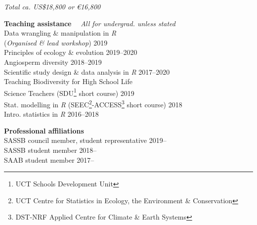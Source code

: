 \documentclass[10pt]{article}
\begin{document}
\begin{multicols}{2}
\begin{center}
  \textit{Total ca. US\$18,800 or €16,800}
\end{center}

\columnbreak

\textbf{Teaching assistance} %
  ~~{\small \textmd{\textit{All for undergrad. unless stated}}}\\

Data wrangling \& manipulation in \textit{R} \\
\hspace{2em} (\textit{Organised \& lead workshop})       \hfill {\small 2019} \\
Principles of ecology \& evolution                 \hfill {\small 2019--2020} \\
Angiosperm diversity                               \hfill {\small 2018--2019} \\
Scientific study design \& data analysis in \textit{R}
                                                   \hfill {\small 2017--2020} \\
Teaching Biodiversity for High School Life \\
\hspace{2em} Science Teachers {\small (SDU\footnote{UCT Schools Development
  Unit} short course)}                                   \hfill {\small 2019} \\
Stat. modelling in \textit{R} {\small (SEEC\footnote{UCT Centre for
  Statistics in Ecology, the Environment \& Conservation}-ACCESS\footnote{
  DST-NRF Applied Centre for Climate \& Earth Systems} short course)}
                                                         \hfill {\small 2018} \\
Intro. statistics in \textit{R}                       \hfill {\small 2016--2018}

\textbf{Professional affiliations}\\ %

SASSB council member, student representative           \hfill {\small 2019--} \\
SASSB student member                                   \hfill {\small 2018--} \\
SAAB student member                                       \hfill {\small 2017--}

\end{multicols}
\end{document}
